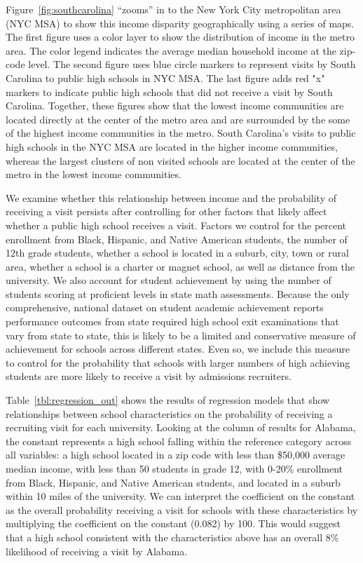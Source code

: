 \documentclass[twoside]{article}
\begin{document}
Figure~\ref{fig:southcarolina} “zooms” in to the New York City metropolitan area (NYC MSA) to show this income disparity geographically using a series of maps. The first figure uses a color layer to show the distribution of income in the metro area. The color legend indicates the average median household income at the zip-code level. The second figure uses blue circle markers to represent visits by South Carolina to public high schools in NYC MSA. The last figure adds red "x" markers to indicate public high schools that did not receive a visit by South Carolina. Together, these figures show that the lowest income communities are located directly at the center of the metro area and are surrounded by the some of the highest income communities in the metro. South Carolina's visits to public high schools in the NYC MSA are located in the higher income communities, whereas the largest clusters of non visited schools are located at the center of the metro in the lowest income communities.


We examine whether this relationship between income and the probability of receiving a visit persists after controlling for other factors that likely affect whether a public high school receives a visit. Factors we control for the percent enrollment from Black, Hispanic, and Native American students, the number of 12th grade students, whether a school is located in a suburb, city, town or rural area, whether a school is a charter or magnet school, as well as distance from the university. We also account for student achievement by using the number of students scoring at proficient levels in state math assessments. Because the only comprehensive, national dataset on student academic achievement reports performance outcomes from state required high school exit examinations that vary from state to state, this is likely to be a limited and conservative measure of achievement for schools across different states. Even so, we include this measure to control for the probability that schools with larger numbers of high achieving students are more likely to receive a visit by admissions recruiters.

Table~\ref{tbl:regression_out} shows the results of regression models that show relationships between school characteristics on the probability of receiving a recruiting visit for each university. Looking at the column of results for Alabama, the constant represents a high school falling within the reference category across all variables: a high school located in a zip code with less than \$50,000 average median income, with less than 50 students in grade 12, with 0-20\% enrollment from Black, Hispanic, and Native American students, and located in a suburb within 10 miles of the university.  We can interpret the coefficient on the constant as the overall probability receiving a visit for schools with these characteristics by multiplying the coefficient on the constant (0.082) by 100. This would suggest that a high school consistent with the characteristics above has an overall 8\% likelihood of receiving a visit by Alabama.
\end{document}
